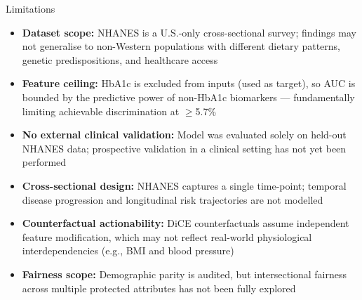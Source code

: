 \documentclass[aspectratio=169, 11pt]{beamer}
\begin{document}
\begin{frame}{Limitations}
  \small
  \begin{itemize}
    \setlength{\itemsep}{7pt}
    \item \textbf{Dataset scope:} NHANES is a U.S.-only cross-sectional survey; findings may not generalise to non-Western populations with different dietary patterns, genetic predispositions, and healthcare access
    \item \textbf{Feature ceiling:} HbA1c is excluded from inputs (used as target), so AUC is bounded by the predictive power of non-HbA1c biomarkers --- fundamentally limiting achievable discrimination at $\geq$5.7\%
    \item \textbf{No external clinical validation:} Model was evaluated solely on held-out NHANES data; prospective validation in a clinical setting has not yet been performed
    \item \textbf{Cross-sectional design:} NHANES captures a single time-point; temporal disease progression and longitudinal risk trajectories are not modelled
    \item \textbf{Counterfactual actionability:} DiCE counterfactuals assume independent feature modification, which may not reflect real-world physiological interdependencies (e.g., BMI and blood pressure)
    \item \textbf{Fairness scope:} Demographic parity is audited, but intersectional fairness across multiple protected attributes has not been fully explored
  \end{itemize}
\end{frame}
\end{document}
